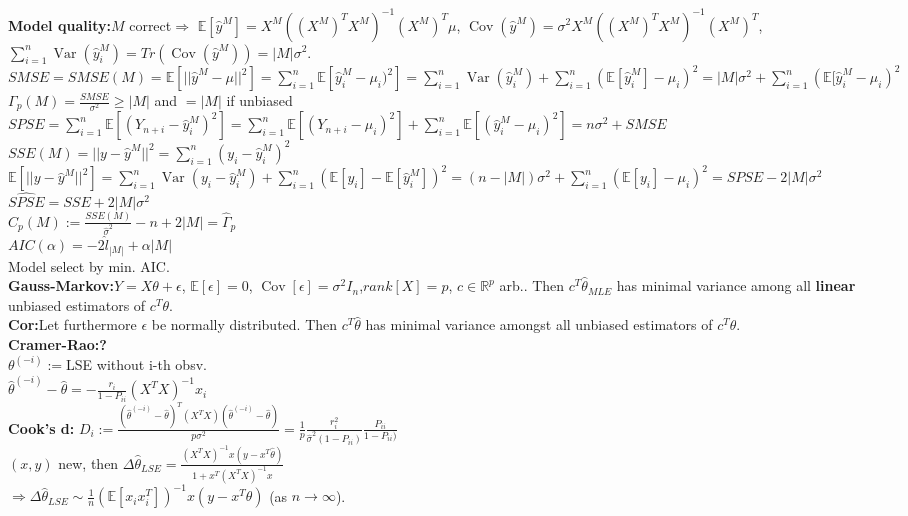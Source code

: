 \documentclass[11pt]{article}
\newcommand{\R}{\mathbb{R}}
\newcommand{\E}{\mathbb{E}}
\DeclareMathOperator*{\V}{Var}
\DeclareMathOperator*{\cov}{Cov}
\begin{document}
\begin{multicols}{4}
\textbf{Model quality:}$M$ correct$\Rightarrow$ $\E[\hat{y}^M]=X^M((X^M)^TX^M)^{-1}(X^M)^T\mu$, $\cov(\hat{y}^M)=\sigma^2X^M((X^M)^TX^M)^{-1}(X^M)^T$, $\sum^n_{i=1}\V(\hat{y}^M_i)=Tr(\cov(\hat{y}^M))=|M|\sigma^2$.\\
$SMSE=SMSE(M)=\E[||\hat{y}^M-\mu||^2]=\sum^n_{i=1}\E[\hat{y}^M_i-\mu_i)^2]=\sum^n_{i=1}\V(\hat{y}^M_i)+\sum^n_{i=1}(\E[\hat{y}^M_i]-\mu_i)^2=|M|\sigma^2+\sum^n_{i=1}(\E[\hat{y}^M_i-\mu_i)^2$\\
$\Gamma_p(M)=\frac{SMSE}{\sigma^2}\geq|M|$ and $=|M|$ if unbiased\\
$SPSE=\sum^n_{i=1}\E[(Y_{n+i}-\hat{y}^M_i)^2]=\sum^n_{i=1}\E[(Y_{n+i}-\mu_i)^2]+\sum^n_{i=1}\E[(\hat{y}^M_i-\mu_i)^2]=n\sigma^2+SMSE$\\
$SSE(M)=||y-\hat{y}^M||^2=\sum^n_{i=1}(y_i-\hat{y}^M_i)^2$\\
$\E[||y-\hat{y}^M||^2]=\sum^n_{i=1}\V(y_i-\hat{y}^M_i)+\sum^n_{i=1}(\E[y_i]-\E[\hat{y}^M_i])^2=(n-|M|)\sigma^2+\sum^n_{i=1}(\E[y_i]-\mu_i)^2=SPSE-2|M|\sigma^2$
$\hat{SPSE}=SSE+2|M|\sigma^2$\\
$C_p(M):=\frac{SSE(M)}{\hat{\sigma}^2}-n+2|M|=\hat{\Gamma}_p$\\
$AIC(\alpha)=-2\hat{l}_{|M|}+\alpha|M|$\\
Model select by min. AIC.\\
\textbf{Gauss-Markov:}$Y=X\theta+\epsilon$, $\E[\epsilon]=0$, $\cov[\epsilon]=\sigma^2I_n$,$rank[X]=p$, $c\in\R^p$ arb.. Then $c^T\hat{\theta}_{MLE}$ has minimal variance among all \textbf{linear} unbiased estimators of $c^T\theta$.\\
\textbf{Cor:}Let furthermore $\epsilon$ be normally distributed. Then $c^T\hat{\theta}$ has minimal variance amongst all unbiased estimators of $c^T\theta$.\\
\textbf{Cramer-Rao:?}\\
$\theta^{(-i)}:=$LSE without i-th obsv.\\
$\hat{\theta}^{(-i)}-\hat{\theta}=-\frac{r_i}{1-P_{ii}}(X^TX)^{-1}x_i$\\
\textbf{Cook's d:} $D_i:=\frac{(\hat{\theta}^{(-i)}-\hat{\theta})^T(X^TX)(\hat{\theta}^{(-i)}-\hat{\theta})}{p\sigma^2}=\frac{1}{p}\frac{r_i^2}{\hat{\sigma}^2(1-P_{ii})}\frac{P_{ii}}{1-P_{ii})}$\\
$(x,y)$ new, then $\Delta\hat{\theta}_{LSE}=\frac{(X^TX)^{-1}x(y-x^T\hat{\theta})}{1+x^T(X^TX)^{-1}x}$\\
$\Rightarrow\Delta\hat{\theta}_{LSE}\sim\frac{1}{n}(\E[x_ix_i^T])^{-1}x(y-x^T\theta)$ (as $n\rightarrow\infty$).\\


\end{multicols}
\end{document}
